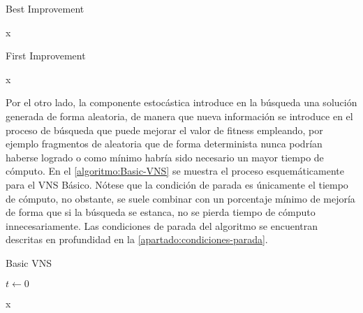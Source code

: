 \begin{algorithm}[htbp]
\caption{Best Improvement}
\label{algoritmo:BestImprovement}

\DontPrintSemicolon
{}
\medskip

\Return x \;

\end{algorithm}

\begin{algorithm}[htbp]
	\caption{First Improvement}
	\label{algoritmo:FirstImprovement}
	
	\DontPrintSemicolon
	\medskip
	
	\Return x \;
	
\end{algorithm}

Por el otro lado, la componente estocástica introduce en la búsqueda una solución generada de forma aleatoria, de manera que nueva información se introduce en el proceso de búsqueda que puede mejorar el valor de fitness empleando, por ejemplo fragmentos de aleatoria que de forma determinista nunca podrían haberse logrado o como mínimo habría sido necesario un mayor tiempo de cómputo. En el \autoref{algoritmo:Basic-VNS} se muestra el proceso esquemáticamente para el VNS Básico. Nótese que la condición de parada es únicamente el tiempo de cómputo, no obstante, se suele combinar con un porcentaje mínimo de mejoría de forma que si la búsqueda se estanca, no se pierda tiempo de cómputo innecesariamente. Las condiciones de parada del algoritmo se encuentran descritas en profundidad en la \autoref{apartado:condiciones-parada}.

\begin{algorithm}[htbp]
	\caption{Basic VNS \cite{vns}}
	\label{algoritmo:Basic-VNS}
	
	\DontPrintSemicolon

	\bigskip
	
	$t \leftarrow 0$ \;
	

	\Return x \;
	
\end{algorithm}

